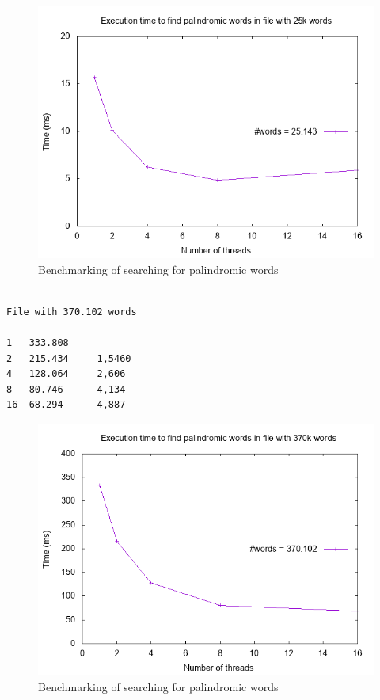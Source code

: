 \documentclass{article}
\begin{document}
\begin{figure}[h]
\centering
\includegraphics[scale=0.5]{words.png}
\caption{Benchmarking of searching for palindromic words}
\end{figure}      
\clearpage

\begin{verbatim}
    
File with 370.102 words 

1   333.808		
2   215.434     1,5460
4   128.064     2,606
8   80.746      4,134
16  68.294      4,887

\end{verbatim}

\begin{figure}[h]
\centering
\includegraphics[scale=0.5]{words-alpha.png}
\caption{Benchmarking of searching for palindromic words}
\end{figure}      
\end{document}
